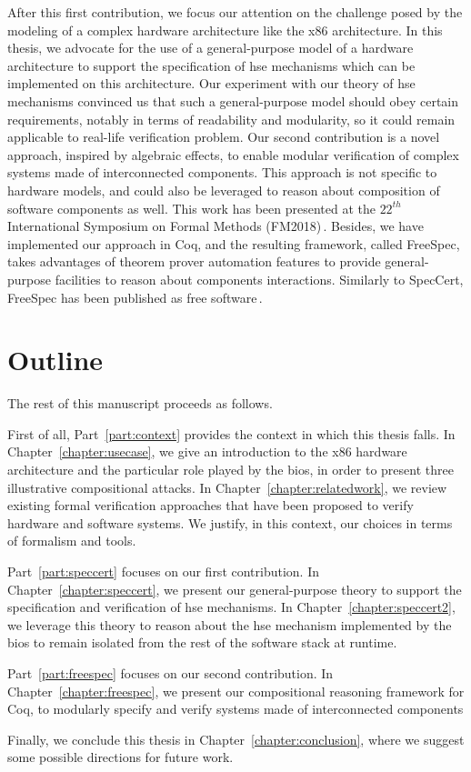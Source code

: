 After this first contribution, we focus our attention on the challenge posed by
the modeling of a complex hardware architecture like the x86 architecture.
%
In this thesis, we advocate for the use of a general-purpose model of a hardware
architecture to support the specification of \ac{hse} mechanisms which can be
implemented on this architecture.
%
Our experiment with our theory of \ac{hse} mechanisms convinced us that such a
general-purpose model should obey certain requirements, notably in terms of
readability and modularity, so it could remain applicable to real-life
verification problem.
%
Our second contribution is a novel approach, inspired by algebraic effects, to
enable modular verification of complex systems made of interconnected
components.
%
This approach is not specific to hardware models, and could also be leveraged to
reason about composition of software components as well.
%
This work has been presented at the $22^{th}$ International Symposium on Formal
Methods (FM2018)\,\cite{letan2018freespec}.
%
Besides, we have implemented our approach in Coq, and the resulting framework,
called FreeSpec, takes advantages of theorem prover automation features to
provide general-purpose facilities to reason about components interactions.
%
Similarly to SpecCert, FreeSpec has been published as free
software\,\cite{letan2018freespeccode}.

\section{Outline}

The rest of this manuscript proceeds as follows.

First of all, Part~\ref{part:context} provides the context in which this thesis
falls.
%
In Chapter~\ref{chapter:usecase}, we give an introduction to the x86 hardware
architecture and the particular role played by the \ac{bios}, in order to
present three illustrative compositional attacks.
%
In Chapter~\ref{chapter:relatedwork}, we review existing formal verification
approaches that have been proposed to verify hardware and software systems.
%
We justify, in this context, our choices in terms of formalism and tools.

Part~\ref{part:speccert} focuses on our first contribution.
%
In Chapter~\ref{chapter:speccert}, we present our general-purpose theory to
support the specification and verification of \ac{hse} mechanisms.
%
In Chapter~\ref{chapter:speccert2}, we leverage this theory to reason about the
\ac{hse} mechanism implemented by the \ac{bios} to remain isolated from the rest
of the software stack at runtime.

Part~\ref{part:freespec} focuses on our second contribution.
%
In Chapter~\ref{chapter:freespec}, we present our compositional reasoning
framework for Coq, to modularly specify and verify systems made of
interconnected components

Finally, we conclude this thesis in Chapter~\ref{chapter:conclusion}, where we
suggest some possible directions for future work.
